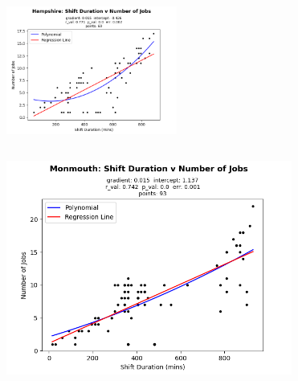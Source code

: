 \documentclass[usenames,dvipsnames]{beamer}
\begin{document}
\begin{frame}
\begin{columns}[T]
\begin{column}{0.5\textwidth}
\begin{figure}
			\end{figure}
		\end{column}
	\end{columns}
\end{frame}

\begin{frame}
	\begin{figure}
		\includegraphics[width=0.5\textwidth]{figures/Hampshire_shift_jobs_abi}
	\end{figure}
	\vspace*{-0.8cm}
	\begin{columns}[T]
		\begin{column}{0.5\textwidth}
			\begin{figure}
				\includegraphics[width=\textwidth]{figures/Monmouth_shift_jobs_abi}
			\end{figure}
		\end{column}%
		\begin{column}{0.5\textwidth}
			\begin{figure}

\end{figure}
\end{column}
\end{columns}
\end{frame}
\end{document}
